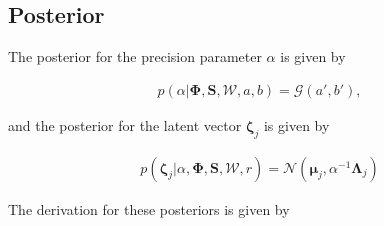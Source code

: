 \documentclass[]{article}
\newcommand{\gD}[2]{\mathcal{N}\left(#1,#2\right)}
\newcommand{\kernelww}[2]{k\left(\mathbf{w}_{#1}^d,\mathbf{w}_{#2}^d\right)}
\newcommand{\catD}[2]{\mathcal{G}\left(#1,#2\right)}
\newcommand{\C}{\boldsymbol{\Lambda}_j}
\newcommand{\muJ}{\boldsymbol{\mu}_j}
\newcommand{\W}{\boldsymbol{\mathcal{W}}}
\newcommand{\lvec}{\boldsymbol{\zeta}_j}
\newcommand{\phiwld}[1]{\boldsymbol{\varphi}\left(\mathbf{w}_{#1}^d\right)}
\newcommand{\phiwldI}[2]{\varphi_{#2}\left(\mathbf{w}_{#1}^d\right)}
\begin{document}



\subsection{Posterior}
The posterior for the precision parameter $\alpha$ is given by

\begin{align}
p\left(\alpha|\boldsymbol{\Phi},\mathbf{S},\W,a,b\right) = \catD{a'}{b'},
\end{align}

and the posterior for the latent vector $\lvec$ is given by

\begin{align}
p\left(\lvec|\alpha,\boldsymbol{\Phi},\mathbf{S},\W,r\right) = \gD{\muJ}{\alpha^{-1}\C}
\end{align}

The derivation for these posteriors is given by
\end{document}
